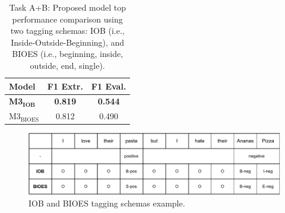 \documentclass[11pt,a4paper]{article}
\begin{document}
	\begin{table}[H]
		\centering
		\begin{tabular}{@{}lcc@{}}
			\toprule
			\textbf{Model}                        & F1 Extr.       & F1 Eval.       \\
			\midrule
			\textbf{M3$_{\mathbf{IOB}}$} & \textbf{0.819} & \textbf{0.544} \\
			M3$_{\mathrm{BIOES}}$                         & 0.812          & 0.490       
			\\ \bottomrule
		\end{tabular}
		\caption{Task A+B: Proposed model top performance comparison using two tagging schemas: IOB (i.e., Inside-Outside-Beginning), and BIOES (i.e., beginning, inside, outside, end, single).}
		\label{tab:ab_iob_bioes}
	\end{table}
	
	\begin{figure}[H]
		\centering
		\includegraphics[width=1\columnwidth]{IOB_BIOES_example.pdf}
		\caption{IOB and BIOES tagging schemas example.}
		\label{fig:IOB_BIOES}
	\end{figure}
	
\end{document}
